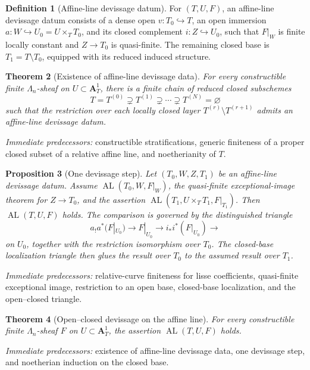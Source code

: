 \documentclass[10pt]{article}
\newtheorem{theorem}{Theorem}[section]
\newtheorem{proposition}[theorem]{Proposition}
\theoremstyle{definition}
\newtheorem{definition}[theorem]{Definition}
\newcommand{\pred}[1]{\par\smallskip\begingroup\footnotesize\raggedright
\emph{Immediate predecessors:} #1.\par\endgroup}
\begin{document}
\begin{definition}[Affine-line devissage datum]
For \((T,U,F)\), an affine-line devissage datum consists of a dense open
\(v:T_0\hookrightarrow T\), an open immersion
\(a:W\hookrightarrow U_0=U\times_TT_0\), and its closed complement
\(i:Z\hookrightarrow U_0\), such that \(F|_W\) is finite locally constant
and \(Z\to T_0\) is quasi-finite.  The remaining closed base is
\(T_1=T\setminus T_0\), equipped with its reduced induced structure.
\end{definition}

\begin{theorem}[Existence of affine-line devissage data]
For every constructible finite \(\Lambda_n\)-sheaf on
\(U\subset\mathbf A^1_T\), there is a finite chain of reduced closed
subschemes
\[
 T=T^{(0)}\supsetneq T^{(1)}\supsetneq\cdots
 \supsetneq T^{(N)}=\varnothing
\]
such that the restriction over each locally closed layer
\(T^{(r)}\setminus T^{(r+1)}\) admits an affine-line devissage datum.
\end{theorem}
\pred{constructible stratifications, generic finiteness of a proper closed subset of a relative affine line, and noetherianity of \(T\)}

\begin{proposition}[One devissage step]
Let \((T_0,W,Z,T_1)\) be an affine-line devissage datum.  Assume
\(\operatorname{AL}(T_0,W,F|_W)\), the quasi-finite exceptional-image
theorem for \(Z\to T_0\), and the assertion
\(\operatorname{AL}(T_1,U\times_TT_1,F|_{T_1})\).  Then
\(\operatorname{AL}(T,U,F)\) holds.  The comparison is governed by the
distinguished triangle
\[
 a_!a^*(F|_{U_0})\longrightarrow F|_{U_0}
 \longrightarrow i_*i^*(F|_{U_0})\longrightarrow
\]
on \(U_0\), together with the restriction isomorphism over \(T_0\).
The closed-base localization triangle then glues the result over \(T_0\)
to the assumed result over \(T_1\).
\end{proposition}
\pred{relative-curve finiteness for lisse coefficients, quasi-finite exceptional image, restriction to an open base, closed-base localization, and the open--closed triangle}

\begin{theorem}[Open--closed devissage on the affine line]
For every constructible finite \(\Lambda_n\)-sheaf \(F\) on
\(U\subset\mathbf A^1_T\), the assertion
\(\operatorname{AL}(T,U,F)\) holds.
\end{theorem}
\pred{existence of affine-line devissage data, one devissage step, and noetherian induction on the closed base}
\end{document}
